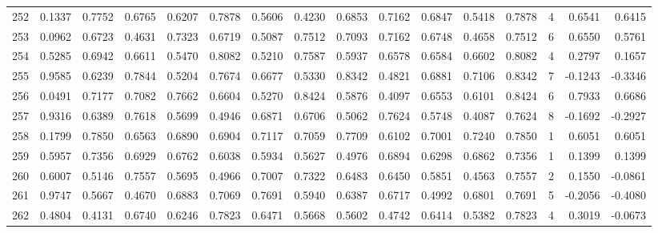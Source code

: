 \begin{tabular}{lrrrrrrrrrrrrrrr}
252 &      0.1337 &  0.7752 &  0.6765 &  0.6207 &  0.7878 &  0.5606 &  0.4230 &  0.6853 &  0.7162 &  0.6847 &   0.5418 &     0.7878 &      4 &                    0.6541 &                     0.6415 \\
253 &      0.0962 &  0.6723 &  0.4631 &  0.7323 &  0.6719 &  0.5087 &  0.7512 &  0.7093 &  0.7162 &  0.6748 &   0.4658 &     0.7512 &      6 &                    0.6550 &                     0.5761 \\
254 &      0.5285 &  0.6942 &  0.6611 &  0.5470 &  0.8082 &  0.5210 &  0.7587 &  0.5937 &  0.6578 &  0.6584 &   0.6602 &     0.8082 &      4 &                    0.2797 &                     0.1657 \\
255 &      0.9585 &  0.6239 &  0.7844 &  0.5204 &  0.7674 &  0.6677 &  0.5330 &  0.8342 &  0.4821 &  0.6881 &   0.7106 &     0.8342 &      7 &                   -0.1243 &                    -0.3346 \\
256 &      0.0491 &  0.7177 &  0.7082 &  0.7662 &  0.6604 &  0.5270 &  0.8424 &  0.5876 &  0.4097 &  0.6553 &   0.6101 &     0.8424 &      6 &                    0.7933 &                     0.6686 \\
257 &      0.9316 &  0.6389 &  0.7618 &  0.5699 &  0.4946 &  0.6871 &  0.6706 &  0.5062 &  0.7624 &  0.5748 &   0.4087 &     0.7624 &      8 &                   -0.1692 &                    -0.2927 \\
258 &      0.1799 &  0.7850 &  0.6563 &  0.6890 &  0.6904 &  0.7117 &  0.7059 &  0.7709 &  0.6102 &  0.7001 &   0.7240 &     0.7850 &      1 &                    0.6051 &                     0.6051 \\
259 &      0.5957 &  0.7356 &  0.6929 &  0.6762 &  0.6038 &  0.5934 &  0.5627 &  0.4976 &  0.6894 &  0.6298 &   0.6862 &     0.7356 &      1 &                    0.1399 &                     0.1399 \\
260 &      0.6007 &  0.5146 &  0.7557 &  0.5695 &  0.4966 &  0.7007 &  0.7322 &  0.6483 &  0.6450 &  0.5851 &   0.4563 &     0.7557 &      2 &                    0.1550 &                    -0.0861 \\
261 &      0.9747 &  0.5667 &  0.4670 &  0.6883 &  0.7069 &  0.7691 &  0.5940 &  0.6387 &  0.6717 &  0.4992 &   0.6801 &     0.7691 &      5 &                   -0.2056 &                    -0.4080 \\
262 &      0.4804 &  0.4131 &  0.6740 &  0.6246 &  0.7823 &  0.6471 &  0.5668 &  0.5602 &  0.4742 &  0.6414 &   0.5382 &     0.7823 &      4 &                    0.3019 &                    -0.0673 \\

\end{tabular}
